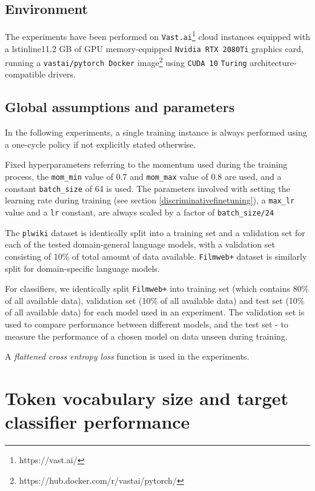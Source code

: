 \subsection{Environment}
\label{tests:env}

The experiments have been performed on \lstinline{Vast.ai}\footnote{https://vast.ai/} cloud instances equipped with a lstinline{11.2 GB} of GPU memory-equipped \lstinline{Nvidia RTX 2080Ti} graphics card, running a \lstinline{vastai/pytorch Docker} image\footnote{https://hub.docker.com/r/vastai/pytorch/} using \lstinline{CUDA 10} \lstinline{Turing} architecture-compatible drivers.

\subsection{Global assumptions and parameters}
\label{tests:assumptions}

In the following experiments, a single training instance is always performed using a one-cycle policy if not explicitly stated otherwise.

Fixed hyperparameters referring to the momentum used during the training process, the \lstinline{mom_min} value of 0.7 and \lstinline{mom_max} value of 0.8 are used, and a constant \lstinline{batch_size} of 64 is used. The parameters involved with setting the learning rate during training (see section \ref{discriminativefinetuning}), a \lstinline{max_lr} value and a \lstinline{lr} constant, are always scaled by a factor of \lstinline{batch_size/24}

The \lstinline{plwiki} dataset is identically split into a training set and a validation set for each of the tested domain-general language models, with a validation set consisting of 10\% of total amount of data available. \lstinline{Filmweb+} dataset is similarly split for domain-specific language models. 

For classifiers, we identically split \lstinline{Filmweb+} into training set (which contains 80\% of all available data), validation set (10\% of all available data) and test set (10\% of all available data) for each model used in an experiment. The validation set is used to compare performance between different models, and the test set - to measure the performance of a chosen model on data unseen during training.

A \emph{flattened cross entropy loss} function is used in the experiments.

\section{Token vocabulary size and target classifier performance}
\label{impact:tokenvocab}

